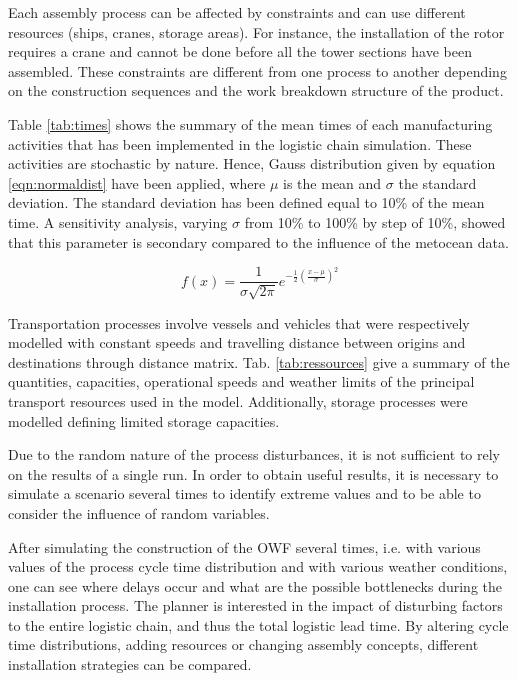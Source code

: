 Each assembly process can be affected by constraints and can use different resources (ships, cranes, storage areas). For instance, the installation of the rotor requires a crane and cannot be done before all the tower sections have been assembled. These constraints are different from one process to another depending on the construction sequences and the work breakdown structure of the product.

Table \ref{tab:times} shows the summary of the mean times of each manufacturing activities that has been implemented in the logistic chain simulation. These activities are stochastic by nature. Hence, Gauss distribution given by equation \ref{eqn:normaldist} have been applied, where $\mu$ is the mean and $\sigma$ the standard deviation. The standard deviation has been defined equal to 10\% of the mean time. A sensitivity analysis, varying $\sigma$ from 10\% to 100\% by step of 10\%, showed that this parameter is secondary compared to the influence of the metocean data. 

\begin{equation}
\label{eqn:normaldist}
f\left( x \right) = \frac{1}{\sigma \sqrt{2 \pi} } e^{- \frac{1}{2} \left( \frac{x - \mu}{\sigma} \right)^{2}}
\end{equation}

Transportation processes involve vessels and vehicles that were respectively modelled with constant speeds and travelling distance between origins and destinations through distance matrix. Tab. \ref{tab:ressources} give a summary of the quantities, capacities, operational speeds and weather limits of the principal transport resources used in the model. Additionally, storage processes were modelled defining limited storage capacities.

Due to the random nature of the process disturbances, it is not sufficient to rely on the results of a single run. In order to obtain useful results, it is necessary to simulate a scenario several times to identify extreme values and to be able to consider the influence of random variables.

After simulating the construction of the OWF several times, i.e. with various values of the process cycle time distribution and with various weather conditions, one can see where delays occur and what are the possible bottlenecks during the installation process. The planner is interested in the impact of disturbing factors to the entire logistic chain, and thus the total logistic lead time. By altering cycle time distributions, adding resources or changing assembly concepts, different installation strategies can be compared.